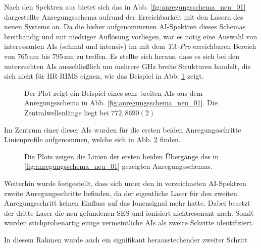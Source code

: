Nach den Spektren aus \cite{raeder:2011:dissertation} bietet sich das in Abb.
\ref{fig:anregungsschema_neu_01} dargestellte Anregungsschema aufrund der
Erreichbarkeit mit den Lasern des neuen Systems an. Da die bisher
aufgenommenen AI-Spektren dieses Schemas breitbandig und mit niedriger Auflösung vorliegen, war es nötig eine Auswahl von
interessanten AIs (schmal und intensiv) im mit dem \textit{TA-Pro} erreichbaren
Bereich von $765\,$nm bis $795\,$nm zu treffen. Es stellte
sich heraus, dass es sich bei den untersuchten AIs ausschließlich um mehrere GHz
breite Strukturen handelt, die sich nicht für HR-RIMS eignen, wie das Beispiel
in Abb. \ref{fig:linienscans_neues_schema_01_AI_bsp} zeigt.
\begin{figure}[h]
 	\centering
 	\footnotesize
	
	\caption[AI Beispiel, neues Schema (1)]{Der Plot zeigt ein
	Beispiel eines sehr breiten AIs aus dem Anregungsschema in Abb.
	\ref{fig:anregungsschema_neu_01}. Die Zentralwellenlänge liegt bei
	$772,8690(2)$}
	\label{fig:linienscans_neues_schema_01_AI_bsp}
\end{figure}
Im Zentrum einer dieser AIs wurden für die ersten beiden Anregungsschritte
Linienprofile aufgenommen, welche sich in Abb. \ref{fig:linienscans_neues_schema_01} finden.
\begin{figure}[hp]
 	\centering
 	\footnotesize
	\caption[erster und zweiter Anregungsschritt, neues System, Schema (1)]{Die
	Plots zeigen die Linien der ersten beiden Übergänge des in
	\ref{fig:anregungsschema_neu_01} gezeigten Anregungsschemas.}
	\label{fig:linienscans_neues_schema_01}
\end{figure}
Weiterhin wurde festgestellt, dass sich unter den in
\cite{raeder:2011:dissertation} verzeichneten AI-Spektren zweite
Anregungsschritte befinden, da der eigentliche Laser für den
zweiten Anregungsschritt keinen Einfluss auf das Ionensignal mehr hatte. Dabei
besetzt der dritte Laser die neu gefundenen SES und
ionisiert nichtresonant nach. Somit wurden stichprobenartig einige
vermeintliche AIs als zweite Schritte identifiziert.\par
In diesem Rahmen wurde auch ein signifikant herausstechender zweiter Schritt
